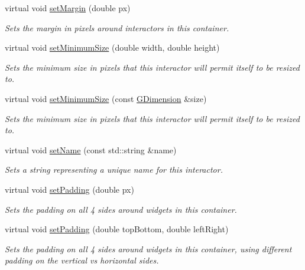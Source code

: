 \begin{DoxyCompactItemize}
virtual void \mbox{\hyperlink{classGContainer_a79b7a5ffc0a63c8f11be4ed59808f60d}{set\+Margin}} (double px)
\begin{DoxyCompactList}\small\item\em Sets the margin in pixels around interactors in this container. \end{DoxyCompactList}\item 
virtual void \mbox{\hyperlink{classGInteractor_a0cf428e207b7f22cc08138a90b1b87b2}{set\+Minimum\+Size}} (double width, double height)
\begin{DoxyCompactList}\small\item\em Sets the minimum size in pixels that this interactor will permit itself to be resized to. \end{DoxyCompactList}\item 
virtual void \mbox{\hyperlink{classGInteractor_a3b1046117ac6cb7abe467e00ba8a81f4}{set\+Minimum\+Size}} (const \mbox{\hyperlink{classGDimension}{G\+Dimension}} \&size)
\begin{DoxyCompactList}\small\item\em Sets the minimum size in pixels that this interactor will permit itself to be resized to. \end{DoxyCompactList}\item 
virtual void \mbox{\hyperlink{classGInteractor_a9d3a2685df23b5e7cbf59c19c4a1f9b5}{set\+Name}} (const std\+::string \&name)
\begin{DoxyCompactList}\small\item\em Sets a string representing a unique name for this interactor. \end{DoxyCompactList}\item 
virtual void \mbox{\hyperlink{classGContainer_a81b293e913c083a544af96f031668225}{set\+Padding}} (double px)
\begin{DoxyCompactList}\small\item\em Sets the padding on all 4 sides around widgets in this container. \end{DoxyCompactList}\item 
virtual void \mbox{\hyperlink{classGContainer_a76dc599dd8828f0ab534ab0d1b0c5ef8}{set\+Padding}} (double top\+Bottom, double left\+Right)
\begin{DoxyCompactList}\small\item\em Sets the padding on all 4 sides around widgets in this container, using different padding on the vertical vs horizontal sides. \end{DoxyCompactList}\item 

\end{DoxyCompactItemize}
